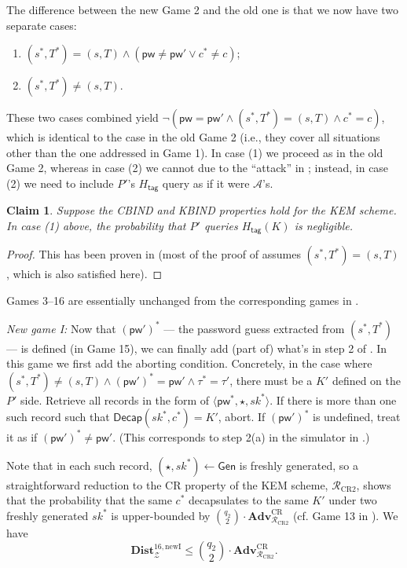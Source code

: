 \documentclass{article}
\theoremstyle{plain}
\newtheorem{claim}{Claim}
\theoremstyle{definition}
\theoremstyle{remark}
\newcommand{\adv}{\mathcal{A}}
\newcommand{\env}{\mathcal{Z}}
\newcommand{\red}{\mathcal{R}}
\newcommand{\Adv}{\mathbf{Adv}}
\newcommand{\Dist}{\mathbf{Dist}}
\newcommand{\Gen}{\mathsf{Gen}}
\newcommand{\Decap}{\mathsf{Decap}}
\newcommand{\Htag}{H_\mathsf{tag}}
\newcommand{\pw}{\mathsf{pw}}
\begin{document}
The difference between the new Game 2 and the old one is that we now have two separate cases:
\begin{enumerate}
  \item $(s^*,T^*) = (s,T) \land (\pw \neq \pw' \lor c^* \neq c)$;
  \item $(s^*,T^*) \neq (s,T)$.
\end{enumerate}
These two cases combined yield $\neg(\pw = \pw' \land (s^*,T^*) = (s,T) \land c^* = c)$, which is identical to the case in the old Game 2 (i.e., they cover all situations other than the one addressed in Game 1). In case (1) we proceed as in the old Game 2, whereas in case (2) we cannot due to the ``attack'' in ; instead, in case (2) we need to include $P'$'s $\Htag$ query as if it were $\adv$'s.
\begin{claim}
\label{clm:htag8}
Suppose the CBIND and KBIND properties hold for the KEM scheme. In case (1) above, the probability that $P'$ queries $\Htag(K)$ is negligible.
\end{claim}
\begin{proof}
This has been proven in  (most of the proof of  assumes $(s^*,T^*) = (s,T)$, which is also satisfied here).
\end{proof}

\medskip
Games 3--16 are essentially unchanged from the corresponding games in .

\medskip\noindent\emph{New game I:} Now that $(\pw')^*$ --- the password guess extracted from $(s^*,T^*)$ --- is defined (in Game 15), we can finally add (part of) what's in step 2 of . In this game we first add the aborting condition. Concretely, in the case where $(s^*,T^*) \neq (s,T) \land (\pw')^* = \pw' \land \tau^* = \tau'$, there must be a $K'$ defined on the $P'$ side. Retrieve all records in the form of $\langle\pw^*,\star,sk^*\rangle$. If there is more than one such record such that $\Decap(sk^*,c^*) = K'$, abort. If $(\pw')^*$ is undefined, treat it as if $(\pw')^* \neq \pw'$. (This corresponds to step 2(a) in the simulator in .)

Note that in each such record, $(\star,sk^*) \gets \Gen$ is freshly generated, so a straightforward reduction to the CR property of the KEM scheme, $\red_\text{CR2}$, shows that the probability that the same $c^*$ decapsulates to the same $K'$ under two freshly generated $sk^*$ is upper-bounded by ${q_2 \choose 2} \cdot \Adv_{\red_\text{CR2}}^\text{CR}$ (cf. Game 13 in ). We have
\[
\Dist_\env^{16,\text{newI}} \leq {q_2 \choose 2} \cdot \Adv_{\red_\text{CR2}}^\text{CR}.
\]
\end{document}
